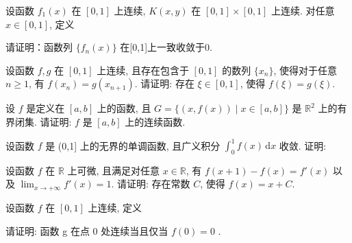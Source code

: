 \par{}
设函数 $f_{1}(x)$ 在 $[0,1]$ 上连续, $K(x,y)$ 在 $[0,1] \times [0,1]$ 上连续. 对任意 $x \in [0,1]$, 定义\par
\nopagebreak[4]
请证明：函数列 $\{f_n(x)\}$ 在[0,1]上一致收敛于0.\par
设函数 $f, g$ 在 $[0,1]$ 上连续, 且存在包含于 $[0,1]$ 的数列 $\{x_n\}$, 使得对于任意 $n \geq 1$, 有 $f(x_n) = g(x_{n+1})$. 请证明: 存在 $\xi \in [0,1]$, 使得 $f(\xi) = g(\xi)$.\par
设 $f$ 是定义在 $[a, b]$ 上的函数, 且 $G = \{(x, f(x)) \mid x \in [a, b]\}$ 是 $\mathbb{R}^2$ 上的有界闭集. 请证明: $f$ 是 $[a, b]$ 上的连续函数.\par
\par{}
设函数 $f$ 是 (0,1] 上的无界的单调函数, 且广义积分 $\int_{0}^{1} f(x) \, \mathrm{d}x$ 收敛. 证明:\par
\nopagebreak[4]
设函数 $f$ 在 $\mathbb{R}$ 上可微, 且满足对任意 $x \in \mathbb{R}$, 有 $f(x + 1) - f(x) = f'(x)$ 以及 $\lim_{x \to +\infty} f'(x) = 1$. 请证明: 存在常数 $C$, 使得 $f(x) = x + C$.\par
\par{}
设函数 $f$ 在 $[0,1]$ 上连续, 定义\par
\nopagebreak[4]
请证明: 函数 g 在点 0 处连续当且仅当  $f(0)=0$ .\par
